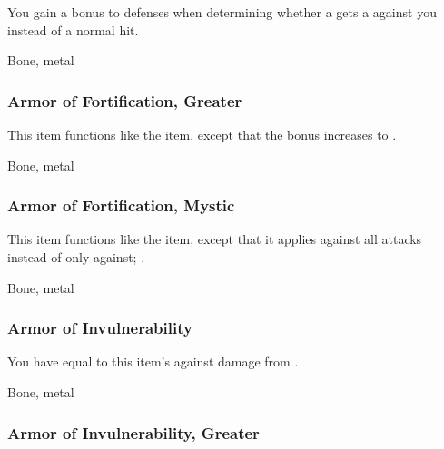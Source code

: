 You gain a  bonus to defenses when determining whether a  gets a  against you instead of a normal hit.



 Bone, metal


\lowercase{\hypertarget{item:Armor of Fortification, Greater}{}}\label{item:Armor of Fortification, Greater}
\hypertarget{item:Armor of Fortification, Greater}{\subsubsection{Armor of Fortification, Greater\hfill{}}}

This item functions like the  item, except that the bonus increases to .



 Bone, metal


\lowercase{\hypertarget{item:Armor of Fortification, Mystic}{}}\label{item:Armor of Fortification, Mystic}
\hypertarget{item:Armor of Fortification, Mystic}{\subsubsection{Armor of Fortification, Mystic\hfill{}}}

This item functions like the  item, except that it applies against all attacks instead of only against; .



 Bone, metal


\lowercase{\hypertarget{item:Armor of Invulnerability}{}}\label{item:Armor of Invulnerability}
\hypertarget{item:Armor of Invulnerability}{\subsubsection{Armor of Invulnerability\hfill{}}}

You have  equal to this item's  against damage from .



 


 Bone, metal


\lowercase{\hypertarget{item:Armor of Invulnerability, Greater}{}}\label{item:Armor of Invulnerability, Greater}
\hypertarget{item:Armor of Invulnerability, Greater}{\subsubsection{Armor of Invulnerability, Greater\hfill{}}}

